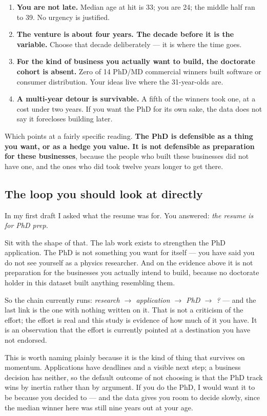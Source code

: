 \documentclass[11pt]{article}
\begin{document}
\begin{enumerate}
\item \textbf{You are not late.} Median age at hit is 33; you are 24; the middle
half ran to 39. No urgency is justified.
\item \textbf{The venture is about four years. The decade before it is the
variable.} Choose that decade deliberately --- it is where the time goes.
\item \textbf{For the kind of business you actually want to build, the
doctorate cohort is absent.} Zero of 14 PhD/MD commercial winners built software
or consumer distribution. Your ideas live where the 31-year-olds are.
\item \textbf{A multi-year detour is survivable.} A fifth of the winners took
one, at a cost under two years. If you want the PhD for its own sake, the data
does not say it forecloses building later.
\end{enumerate}

Which points at a fairly specific reading. \textbf{The PhD is defensible as a
thing you want, or as a hedge you value. It is not defensible as preparation for
these businesses}, because the people who built these businesses did not have
one, and the ones who did took twelve years longer to get there.

\subsection{The loop you should look at directly}

In my first draft I asked what the resume was for. You answered: \emph{the
resume is for PhD prep.}

Sit with the shape of that. The lab work exists to strengthen the PhD
application. The PhD is not something you want for itself --- you have said you
do not see yourself as a physics researcher. And on the evidence above it is not
preparation for the businesses you actually intend to build, because no
doctorate holder in this dataset built anything resembling them.

So the chain currently runs: \emph{research $\rightarrow$ application
$\rightarrow$ PhD $\rightarrow$ ?} --- and the last link is the one with nothing
written on it. That is not a criticism of the effort; the effort is real and
this study is evidence of how much of it you have. It is an observation that the
effort is currently pointed at a destination you have not endorsed.

This is worth naming plainly because it is the kind of thing that survives on
momentum. Applications have deadlines and a visible next step; a business
decision has neither, so the default outcome of not choosing is that the PhD
track wins by inertia rather than by argument. If you do the PhD, I would want
it to be because you decided to --- and the data gives you room to decide slowly,
since the median winner here was still nine years out at your age.
\end{document}

